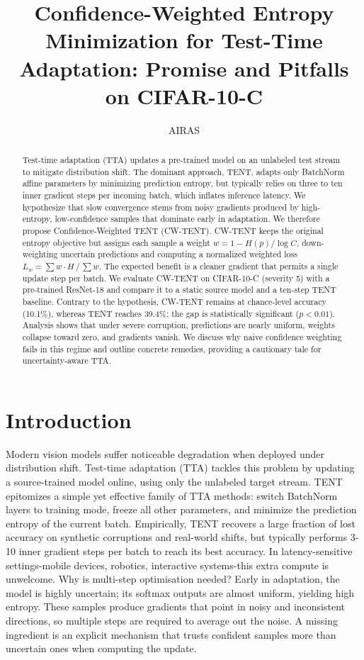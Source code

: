 \documentclass{article} %
\title{Confidence-Weighted Entropy Minimization for Test-Time Adaptation: Promise and Pitfalls on CIFAR-10-C}
\author{AIRAS}
\begin{document}
\maketitle

\begin{abstract}
Test-time adaptation (TTA) updates a pre-trained model on an unlabeled test stream to mitigate distribution shift. The dominant approach, TENT, adapts only BatchNorm affine parameters by minimizing prediction entropy, but typically relies on three to ten inner gradient steps per incoming batch, which inflates inference latency. We hypothesize that slow convergence stems from noisy gradients produced by high-entropy, low-confidence samples that dominate early in adaptation. We therefore propose Confidence-Weighted TENT (CW-TENT). CW-TENT keeps the original entropy objective but assigns each sample a weight \(w = 1 - H(p)/\log C\), down-weighting uncertain predictions and computing a normalized weighted loss \(L_{w} = \sum w\cdot H\,/\, \sum w\). The expected benefit is a cleaner gradient that permits a single update step per batch. We evaluate CW-TENT on CIFAR-10-C (severity 5) with a pre-trained ResNet-18 and compare it to a static source model and a ten-step TENT baseline. Contrary to the hypothesis, CW-TENT remains at chance-level accuracy (10.1\%), whereas TENT reaches 39.4\%; the gap is statistically significant (\(p < 0.01\)). Analysis shows that under severe corruption, predictions are nearly uniform, weights collapse toward zero, and gradients vanish. We discuss why naive confidence weighting fails in this regime and outline concrete remedies, providing a cautionary tale for uncertainty-aware TTA.
\end{abstract}

\section{Introduction}
\label{sec:intro}
Modern vision models suffer noticeable degradation when deployed under distribution shift. Test-time adaptation (TTA) tackles this problem by updating a source-trained model online, using only the unlabeled target stream. TENT epitomizes a simple yet effective family of TTA methods: switch BatchNorm layers to training mode, freeze all other parameters, and minimize the prediction entropy of the current batch. Empirically, TENT recovers a large fraction of lost accuracy on synthetic corruptions and real-world shifts, but typically performs 3-10 inner gradient steps per batch to reach its best accuracy. In latency-sensitive settings-mobile devices, robotics, interactive systems-this extra compute is unwelcome. Why is multi-step optimisation needed? Early in adaptation, the model is highly uncertain; its softmax outputs are almost uniform, yielding high entropy. These samples produce gradients that point in noisy and inconsistent directions, so multiple steps are required to average out the noise. A missing ingredient is an explicit mechanism that trusts confident samples more than uncertain ones when computing the update.
\end{document}
